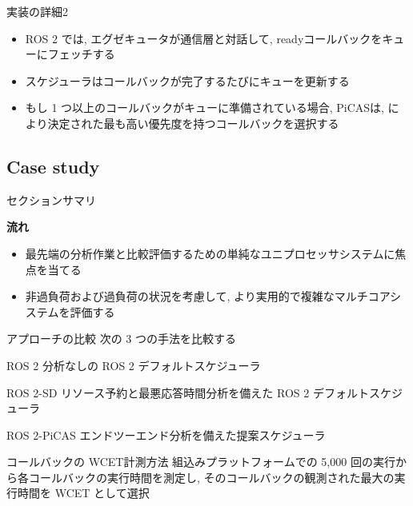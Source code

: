 \begin{frame}{実装の詳細2}
    \begin{itemize}
        \item ROS 2 では, エグゼキュータが通信層と対話して, readyコールバックをキューにフェッチする
        \item スケジューラはコールバックが完了するたびにキューを更新する
        \item もし 1 つ以上のコールバックがキューに準備されている場合, PiCASは,  により決定された最も高い優先度を持つコールバックを選択する
    \end{itemize}
\end{frame}


\subsection{Case study}
\label{ssec: case study}

\begin{frame}{セクションサマリ}
    \begin{itembox}[l]{\textbf{流れ}}
        \begin{itemize}
            \item 最先端の分析作業と比較評価するための単純なユニプロセッサシステムに焦点を当てる
            \item 非過負荷および過負荷の状況を考慮して, より実用的で複雑なマルチコアシステムを評価する
        \end{itemize}
    \end{itembox}
\end{frame}

\begin{frame}{アプローチの比較}
    次の 3 つの手法を比較する
    \begin{block}{ROS 2}
        分析なしの ROS 2 デフォルトスケジューラ
    \end{block}
    \begin{block}{ROS 2-SD}
        リソース予約と最悪応答時間分析を備えた ROS 2 デフォルトスケジューラ~\cite{casini2019response}
    \end{block}
    \begin{block}{ROS 2-PiCAS}
        エンドツーエンド分析を備えた提案スケジューラ
    \end{block}
\end{frame}

\begin{frame}{コールバックの WCET計測方法}
    組込みプラットフォームでの 5,000 回の実行から各コールバックの実行時間を測定し, そのコールバックの観測された最大の実行時間を WCET として選択
\end{frame}

